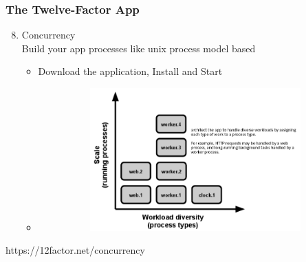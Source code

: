 \documentclass{beamer}
\begin{document}
	\begin{frame}
		\frametitle{The Twelve-Factor App}
		\begin{enumerate}
			\setcounter{enumi}{7}
			\item Concurrency \\
			\hspace{2mm} \scriptsize{Build your app processes like unix process model based}
				
			\begin{itemize}
				\item<1-> \scriptsize {Download the application, Install and Start}
				\item<1->[]
				\begin{figure}[h]
					\includegraphics[width=100mm,height= 55mm, scale=1]{img/process-types.png}
				\end{figure}
			\end{itemize}
		\end{enumerate}
		\tiny{https://12factor.net/concurrency}
	\end{frame}
\end{document}
